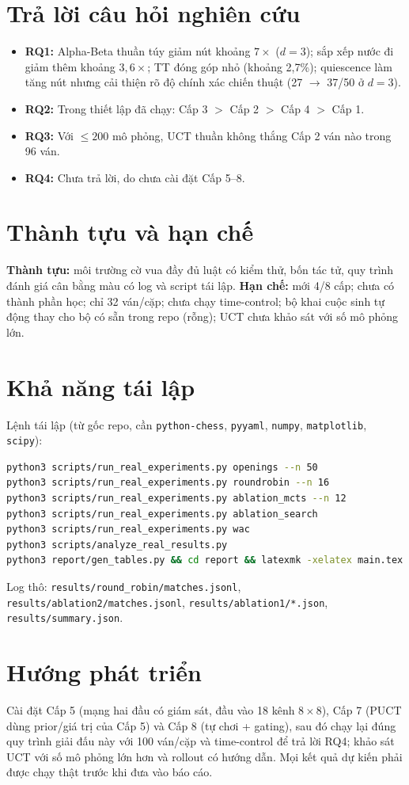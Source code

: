 \documentclass[13pt,a4paper]{extreport}
\newcommand{\code}[1]{\texttt{#1}}
\begin{document}
\section{Trả lời câu hỏi nghiên cứu}
\begin{itemize}
\item \textbf{RQ1:} Alpha-Beta thuần túy giảm nút khoảng $7\times$ ($d=3$); sắp xếp nước đi giảm thêm khoảng $3{,}6\times$; TT đóng góp nhỏ (khoảng 2,7\%); quiescence làm tăng nút nhưng cải thiện rõ độ chính xác chiến thuật (27 $\to$ 37/50 ở $d=3$).
\item \textbf{RQ2:} Trong thiết lập đã chạy: Cấp 3 $>$ Cấp 2 $>$ Cấp 4 $>$ Cấp 1.
\item \textbf{RQ3:} Với $\le 200$ mô phỏng, UCT thuần không thắng Cấp 2 ván nào trong 96 ván.
\item \textbf{RQ4:} Chưa trả lời, do chưa cài đặt Cấp 5--8.
\end{itemize}
\section{Thành tựu và hạn chế}
\textbf{Thành tựu:} môi trường cờ vua đầy đủ luật có kiểm thử, bốn tác tử, quy trình đánh giá cân bằng màu có log và script tái lập. \textbf{Hạn chế:} mới 4/8 cấp; chưa có thành phần học; chỉ 32 ván/cặp; chưa chạy time-control; bộ khai cuộc sinh tự động thay cho bộ có sẵn trong repo (rỗng); UCT chưa khảo sát với số mô phỏng lớn.

\section{Khả năng tái lập}
Lệnh tái lập (từ gốc repo, cần \code{python-chess}, \code{pyyaml}, \code{numpy}, \code{matplotlib}, \code{scipy}):
\begin{lstlisting}[language=bash]
python3 scripts/run_real_experiments.py openings --n 50
python3 scripts/run_real_experiments.py roundrobin --n 16
python3 scripts/run_real_experiments.py ablation_mcts --n 12
python3 scripts/run_real_experiments.py ablation_search
python3 scripts/run_real_experiments.py wac
python3 scripts/analyze_real_results.py
python3 report/gen_tables.py && cd report && latexmk -xelatex main.tex
\end{lstlisting}
Log thô: \code{results/round\_robin/matches.jsonl}, \code{results/ablation2/matches.jsonl}, \code{results/ablation1/*.json}, \code{results/summary.json}.

\section{Hướng phát triển}\label{sec:future}
Cài đặt Cấp 5 (mạng hai đầu có giám sát, đầu vào 18 kênh $8\times8$), Cấp 7 (PUCT dùng prior/giá trị của Cấp 5) và Cấp 8 (tự chơi + gating), sau đó chạy lại đúng quy trình giải đấu này với 100 ván/cặp và time-control để trả lời RQ4; khảo sát UCT với số mô phỏng lớn hơn và rollout có hướng dẫn. Mọi kết quả dự kiến phải được chạy thật trước khi đưa vào báo cáo.
\end{document}
